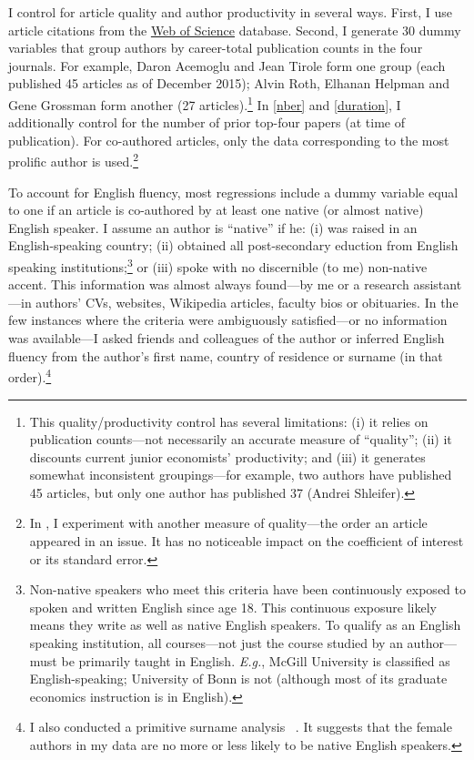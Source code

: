 \begin{appendices}
I control for article quality and author productivity in several ways. First, I use article citations from the \href{https://login.webofknowledge.com/error/Error?Error=IPError&PathInfo=%2F&RouterURL=https%3A%2F%2Fwww.webofknowledge.com%2F&Domain=.webofknowledge.com&Src=IP&Alias=WOK5}{Web of Science} database. Second, I generate 30 dummy variables that group authors by career-total publication counts in the four journals. For example, Daron Acemoglu and Jean Tirole form one group (each published 45 articles as of December 2015); Alvin Roth, Elhanan Helpman and Gene Grossman form another (27 articles).\footnote{\label{fn7}This quality\slash productivity control has several limitations: (i) it relies on publication counts---not necessarily an accurate measure of ``quality''; (ii) it discounts current junior economists' productivity; and (iii) it generates somewhat inconsistent groupings---for example, two authors have published 45 articles, but only one author has published 37 (Andrei Shleifer).} In \autoref{nber} and \autoref{duration}, I additionally control for the number of prior top-four papers (at time of publication). For co-authored articles, only the data corresponding to the most prolific author is used.\footnote{In  \citet[][p. 42 and p. 44]{Hengel2016}, I experiment with another measure of quality---the order an article appeared in an issue. It has no noticeable impact on the coefficient of interest or its standard error.}

To account for English fluency, most regressions include a dummy variable equal to one if an article is co-authored by at least one native (or almost native) English speaker. I assume an author is ``native'' if he: (i) was raised in an English-speaking country; (ii) obtained all post-secondary eduction from English speaking institutions;\footnote{Non-native speakers who meet this criteria have been continuously exposed to spoken and written English since age 18. This continuous exposure likely means they write as well as native English speakers. To qualify as an English speaking institution, all courses---not just the course studied by an author---must be primarily taught in English. \emph{E.g.}, McGill University is classified as English-speaking; University of Bonn is not (although most of its graduate economics instruction is in English).} or (iii) spoke with no discernible (to me) non-native accent. This information was almost always found---by me or a research assistant---in authors' CVs, websites, Wikipedia articles, faculty bios or obituaries. In the few instances where the criteria were ambiguously satisfied---or no information was available---I asked friends and colleagues of the author or inferred English fluency from the author's first name, country of residence or surname (in that order).\footnote{I also conducted a primitive surname analysis ~\citep[see][pp. 35--36]{Hengel2016}. It suggests that the female authors in my data are no more or less likely to be native English speakers.}


\end{appendices}
